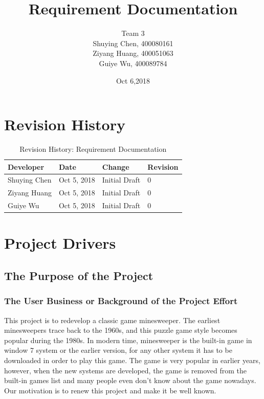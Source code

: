 \documentclass[10pt]{article}
\title{Requirement Documentation}
\author{Team 3\\
        Shuying Chen, 400080161\\
        Ziyang Huang, 400051063\\
        Guiye Wu, 400089784
}
\date{Oct 6,2018}
\begin{document}
\maketitle
\newpage

 
\tableofcontents
\newpage

\section{Revision History}
\begin{table}[h!]
    \caption{Revision History: Requirement Documentation}
    \begin{center}
	\begin{tabular}{|p{2.5cm}|p{2.0cm}||p{2.0cm}|p{2.0cm}|}
	\hline
	\textbf{Developer} & \textbf{Date} & \textbf{Change} & \textbf{Revision}\\
	\hline
      Shuying Chen & Oct 5, 2018 & Initial Draft & 0\\
      \hline
      Ziyang Huang & Oct 5, 2018 & Initial Draft & 0\\
      \hline
      Guiye Wu & Oct 5, 2018 & Initial Draft & 0\\
      \hline
	\end{tabular}
    \end{center}
	\end{table}
	\newpage
\section{Project Drivers}
\subsection{The Purpose of the Project}
\subsubsection{The User Business or Background of the Project Effort}
This project is to redevelop a classic game minesweeper. The earliest minesweepers trace back to the 1960s, and this puzzle game style becomes popular during the 1980s. In modern time, minesweeper is the built-in game in window 7 system or the earlier version, for any other system it has to be downloaded in order to play this game. The game is very popular in earlier years, however, when the new systems are developed, the game is removed from the built-in games list and many people even don't know about the game nowadays. Our motivation is to renew this project and make it be well known.
\end{document}
